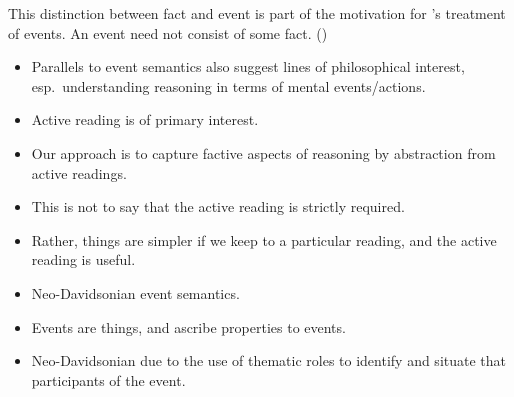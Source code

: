 \documentclass[10pt]{article}
\newcommand{\hozlinedash}[0]{%
  \noindent\hdashrule[0.5ex][c]{\textwidth}{.1pt}{2.5pt}
}
\begin{document}

This distinction between fact and event is part of the motivation for \citeauthor{Davidson:2001aa}'s treatment of events.
An event need not consist of some fact.
(\citeyear[116]{Davidson:2001aa})

\begin{itemize}
\item Parallels to event semantics also suggest lines of philosophical interest, esp.\ understanding reasoning in terms of mental events/actions.
\end{itemize}

\hozlinedash

\begin{itemize}
\item Active reading is of primary interest.
\item Our approach is to capture factive aspects of reasoning by abstraction from active readings.
\item This is not to say that the active reading is strictly required.
\item Rather, things are simpler if we keep to a particular reading, and the active reading is useful.
\end{itemize}

\begin{itemize}
\item Neo-Davidsonian event semantics.
\item Events are things, and ascribe properties to events.
\item Neo-Davidsonian due to the use of thematic roles to identify and situate that participants of the event.
\end{itemize}

\hozlinedash
\end{document}

